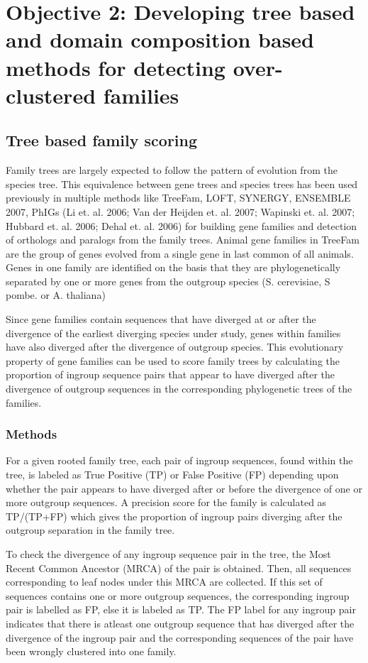 \documentclass{article}
\begin{document}
			\pagebreak
	
	\section{Objective 2: Developing tree based and domain composition based methods for detecting over-clustered families}	
	\subsection{Tree based family scoring}
	Family trees are largely expected to follow the pattern of evolution from the species tree. This equivalence between gene trees and species trees has been used previously in multiple methods like TreeFam, LOFT, SYNERGY, ENSEMBLE 2007, PhIGs (Li et. al. 2006; Van der Heijden et. al. 2007; Wapinski et. al. 2007; Hubbard et. al. 2006; Dehal et. al. 2006) for building gene families and detection of orthologs and paralogs from the family trees. Animal gene families in TreeFam are the group of genes evolved from a single gene in last common of all animals. Genes in one family are identified on the basis that they are phylogenetically separated by one or more genes from the outgroup species (S. cerevisiae, S pombe. or A. thaliana)
	
	Since gene families contain sequences that have diverged at or after the divergence of the earliest diverging species under study, genes within families have also diverged after the divergence of outgroup species. This evolutionary property of gene families can be used to score family trees by calculating the proportion of ingroup sequence pairs that appear to have diverged after the divergence of outgroup sequences in the corresponding phylogenetic trees of the families.
		\subsubsection{Methods}
		For a given rooted family tree, each pair of ingroup sequences, found within the tree, is labeled as True Positive (TP) or False Positive (FP) depending upon whether the pair appears to have diverged after or before the divergence of one or more outgroup sequences. A precision score for the family is calculated  as TP/(TP+FP) which gives the proportion of ingroup pairs diverging after the outgroup separation in the family tree.
		
		To check the divergence of any ingroup sequence pair in the tree, the Most Recent Common Ancestor (MRCA) of the pair is obtained. Then, all sequences corresponding to leaf nodes under this MRCA are collected. If this set of sequences contains one or more outgroup sequences, the corresponding ingroup pair is labelled as FP, else it is labeled as TP. The FP label for any ingroup pair indicates that there is atleast one outgroup sequence that has diverged after the divergence of the ingroup pair and the corresponding sequences of the pair have been wrongly clustered into one family. 
		
\end{document}
